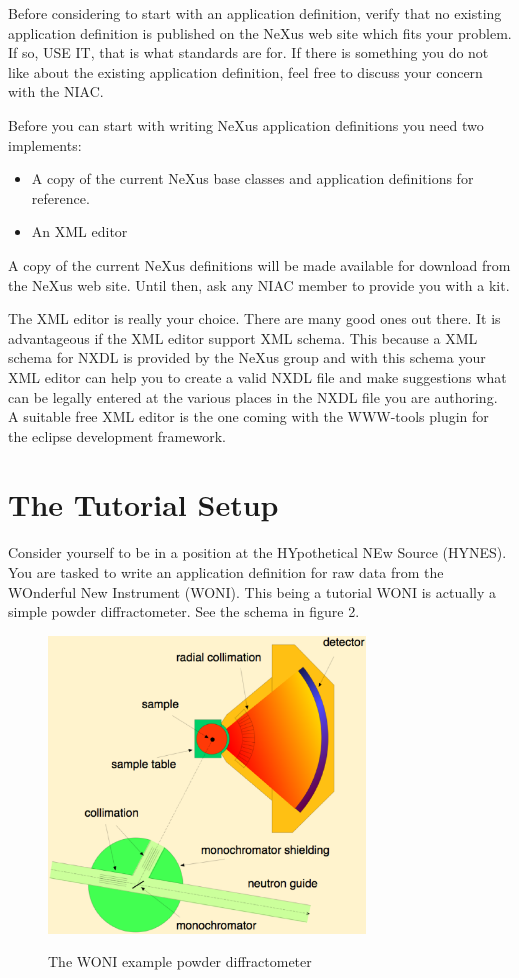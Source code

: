 \documentclass[a4paper]{article}\usepackage[dvips]{graphicx}
\begin{document}
Before considering to start with an application definition, verify that no existing application definition 
is published on the NeXus web site which fits your problem. If so, USE IT, that is what standards are for. If there 
is something you do not like about the existing application definition, feel free to discuss your 
concern with the NIAC. 


Before you can start with writing NeXus application definitions you need two implements:


\begin{itemize}\item A copy of the current NeXus base classes and application definitions for reference.
\item An XML editor
\end{itemize}
A copy of the current NeXus definitions will be made available for download from the NeXus web site. 
Until then, ask any NIAC member to provide you with a kit.


The XML editor is really your choice. There are many good ones out  there. It is advantageous if the XML 
editor support XML schema. This because a XML schema for NXDL is provided by the NeXus group and with 
this schema your XML editor can help you to create a valid NXDL file and make suggestions what  can be 
legally entered at the various places in the NXDL file you are authoring. A suitable free XML editor is the one 
coming with the WWW-tools  plugin for the eclipse development framework.



\section{The Tutorial Setup }

Consider yourself to be in a position at the HYpothetical NEw Source (HYNES).  You are tasked to write an 
application definition for raw data from the WOnderful New Instrument (WONI). This being a tutorial WONI is actually a simple 
powder diffractometer. See the schema in figure 2.
\begin{figure}[!ht]
\includegraphics[width=0.75\textwidth]{dmc.eps}
\label{fig2}
\caption{The WONI example powder diffractometer}
\end{figure}
\end{document}
